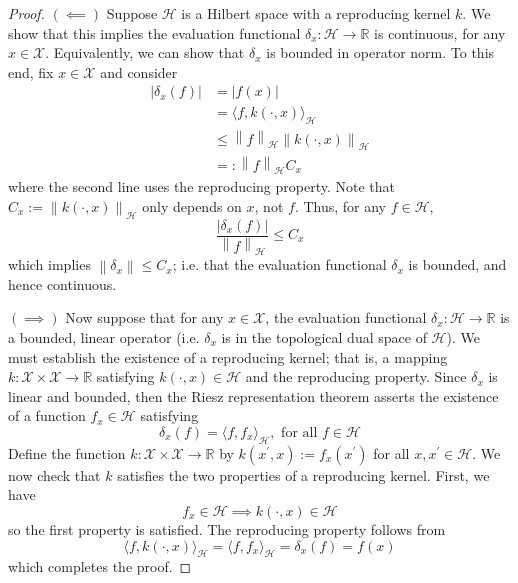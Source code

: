 \documentclass[12pt]{article}
\newcommand*{\norm}[1]{\left\lVert#1\right\rVert}
\newcommand*{\abs}[1]{\left\lvert#1\right\rvert}
\newcommand{\R}{\mathbb{R}}
\begin{document}
 \begin{proof} 
 $(\impliedby)$ Suppose $\mathcal{H}$ is a Hilbert space with a reproducing kernel $k$. We show that this implies the evaluation functional $\delta_x: \mathcal{H} \to \R$ is continuous, for any 
 $x \in \mathcal{X}$. Equivalently, we can show that $\delta_x$ is bounded in operator norm. To this end, fix $x \in \mathcal{X}$ and consider
 \begin{align*}
 \abs{\delta_x(f)} &= \abs{f(x)} \\
 			  &= \langle f, k(\cdot, x) \rangle_{\mathcal{H}} \\
			  &\leq \norm{f}_{\mathcal{H}} \norm{k(\cdot, x)}_{\mathcal{H}} \\
			  &=: \norm{f}_{\mathcal{H}} C_x
 \end{align*}
 where the second line uses the reproducing property. Note that $C_x := \norm{k(\cdot, x)}_{\mathcal{H}}$ only depends on $x$, not $f$. Thus, for any $f \in \mathcal{H}$, 
 \[\frac{ \abs{\delta_x(f)}}{\norm{f}_{\mathcal{H}}} \leq C_x\]
 which implies $\norm{\delta_x} \leq C_x$; i.e. that the evaluation functional $\delta_x$ is bounded, and hence continuous.
 
 $(\implies)$ Now suppose that for any $x \in \mathcal{X}$, the evaluation functional $\delta_x: \mathcal{H} \to \R$ is a bounded, linear operator (i.e. $\delta_x$ is in the topological dual space 
 of $\mathcal{H}$). We must establish the existence of a reproducing kernel; that is, a mapping $k: \mathcal{X} \times \mathcal{X} \to \R$ satisfying $k(\cdot, x) \in \mathcal{H}$ and the 
 reproducing property. Since $\delta_x$ is linear and bounded, then the Riesz representation theorem asserts the existence of a function $f_x \in \mathcal{H}$ satisfying 
 \[\delta_x(f) = \langle f, f_x \rangle_{\mathcal{H}}, \text{ for all } f \in \mathcal{H}\]
 Define the function $k: \mathcal{X} \times \mathcal{X} \to \R$ by $k(x^\prime, x) := f_x(x^\prime)$ for all $x, x^\prime \in \mathcal{H}$. We now check that $k$ satisfies the two properties of a 
 reproducing kernel. First, we have
 \[f_x \in \mathcal{H} \implies k(\cdot, x) \in \mathcal{H}\]
 so the first property is satisfied. The reproducing property follows from 
 \[\langle f, k(\cdot, x)\rangle_{\mathcal{H}} = \langle f, f_x \rangle_{\mathcal{H}} = \delta_x(f) = f(x)\]
 which completes the proof. 
\end{proof}
\end{document}

